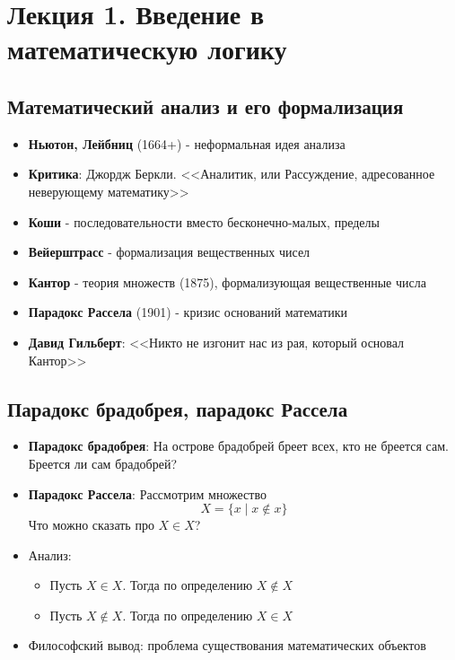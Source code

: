 \section{Лекция 1. Введение в математическую логику}


\subsection{Математический анализ и его формализация}

\begin{itemize}
\item \textbf{Ньютон, Лейбниц} (1664+) - неформальная идея анализа
\item \textbf{Критика}: Джордж Беркли. <<Аналитик, или Рассуждение, адресованное неверующему математику>>
\item \textbf{Коши} - последовательности вместо бесконечно-малых, пределы
\item \textbf{Вейерштрасс} - формализация вещественных чисел
\item \textbf{Кантор} - теория множеств (1875), формализующая вещественные числа
\item \textbf{Парадокс Рассела} (1901) - кризис оснований математики
\item \textbf{Давид Гильберт}: <<Никто не изгонит нас из рая, который основал Кантор>>
\end{itemize}

\subsection{Парадокс брадобрея, парадокс Рассела}

\begin{itemize}
\item \textbf{Парадокс брадобрея}: На острове брадобрей бреет всех, кто не бреется сам. Бреется ли сам брадобрей?
\item \textbf{Парадокс Рассела}: Рассмотрим множество 
$$X = \{ x \mid x \notin x\}$$
Что можно сказать про $X \in X$?

\item Анализ:
\begin{itemize}
\item Пусть $X \in X$. Тогда по определению $X \notin X$
\item Пусть $X \notin X$. Тогда по определению $X \in X$
\end{itemize}

\item Философский вывод: проблема существования математических объектов
\end{itemize}

